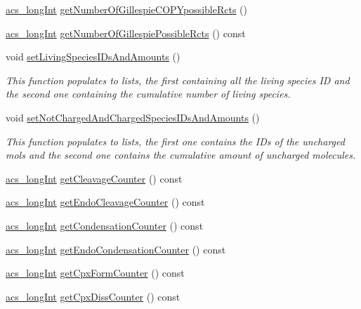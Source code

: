 \begin{DoxyCompactItemize}
\item 
\hyperlink{a00024_a19319d75f02db4308bc5c0026d98cd85}{acs\-\_\-long\-Int} \hyperlink{a00011_a61d3f0644f40fb68be59bff6fad5176e}{get\-Number\-Of\-Gillespie\-C\-O\-P\-Ypossible\-Rcts} ()
\item 
\hyperlink{a00024_a19319d75f02db4308bc5c0026d98cd85}{acs\-\_\-long\-Int} \hyperlink{a00011_a3140242018e8232dfa89a127ac1bb282}{get\-Number\-Of\-Gillespie\-Possible\-Rcts} () const 
\item 
void \hyperlink{a00011_a4fb98d7cad06ef479e2643785231feb9}{set\-Living\-Species\-I\-Ds\-And\-Amounts} ()
\begin{DoxyCompactList}\small\item\em This function populates to lists, the first containing all the living species I\-D and the second one containing the cumulative number of living species. \end{DoxyCompactList}\item 
void \hyperlink{a00011_ac5528a39937cdc76f0dd23c27542110c}{set\-Not\-Charged\-And\-Charged\-Species\-I\-Ds\-And\-Amounts} ()
\begin{DoxyCompactList}\small\item\em This function populates to lists, the first one contains the I\-Ds of the uncharged mols and the second one contains the cumulative amount of uncharged molecules. \end{DoxyCompactList}\item 
\hyperlink{a00024_a19319d75f02db4308bc5c0026d98cd85}{acs\-\_\-long\-Int} \hyperlink{a00011_a8b9a3b5c5a2f86206c5fb124352e366e}{get\-Cleavage\-Counter} () const 
\item 
\hyperlink{a00024_a19319d75f02db4308bc5c0026d98cd85}{acs\-\_\-long\-Int} \hyperlink{a00011_aa2ded3c5ba8c4ce41ee86399dc616d4a}{get\-Endo\-Cleavage\-Counter} () const 
\item 
\hyperlink{a00024_a19319d75f02db4308bc5c0026d98cd85}{acs\-\_\-long\-Int} \hyperlink{a00011_a0fc62131bf552c2a995c7ddc461828cd}{get\-Condensation\-Counter} () const 
\item 
\hyperlink{a00024_a19319d75f02db4308bc5c0026d98cd85}{acs\-\_\-long\-Int} \hyperlink{a00011_aaa23d550cfa37344dd3bb4d5767e6ea0}{get\-Endo\-Condensation\-Counter} () const 
\item 
\hyperlink{a00024_a19319d75f02db4308bc5c0026d98cd85}{acs\-\_\-long\-Int} \hyperlink{a00011_a5d72675f37c3936c58d27480613a9ab6}{get\-Cpx\-Form\-Counter} () const 
\item 
\hyperlink{a00024_a19319d75f02db4308bc5c0026d98cd85}{acs\-\_\-long\-Int} \hyperlink{a00011_abf2f63b22c52e17f6089f098651584b8}{get\-Cpx\-Diss\-Counter} () const 

\end{DoxyCompactItemize}
